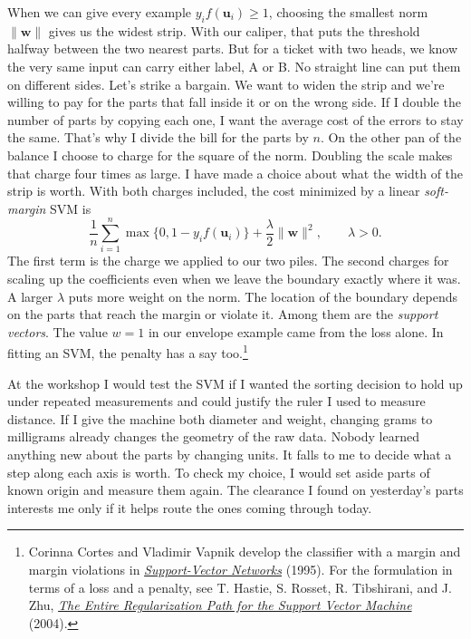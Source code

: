 When we can give every example $y_i f(\boldsymbol u_i)\geq1$, choosing the smallest norm $\lVert\boldsymbol w\rVert$ gives us the widest strip. With our caliper, that puts the threshold halfway between the two nearest parts. But for a ticket with two heads, we know the very same input can carry either label, A or B. No straight line can put them on different sides. Let's strike a bargain. We want to widen the strip and we're willing to pay for the parts that fall inside it or on the wrong side. If I double the number of parts by copying each one, I want the average cost of the errors to stay the same. That's why I divide the bill for the parts by $n$. On the other pan of the balance I choose to charge for the square of the norm. Doubling the scale makes that charge four times as large. I have made a choice about what the width of the strip is worth. With both charges included, the cost minimized by a linear \emph{soft-margin} SVM is
\[
 \frac1n\sum_{i=1}^n \max\{0,1-y_i f(\boldsymbol u_i)\}
       +\frac{\lambda}{2}\lVert\boldsymbol w\rVert^2,\qquad \lambda>0.
\]
The first term is the charge we applied to our two piles. The second charges for scaling up the coefficients even when we leave the boundary exactly where it was. A larger $\lambda$ puts more weight on the norm. The location of the boundary depends on the parts that reach the margin or violate it. Among them are the \emph{support vectors}. The value $w=1$ in our envelope example came from the loss alone. In fitting an SVM, the penalty has a say too.\footnote{Corinna Cortes and Vladimir Vapnik develop the classifier with a margin and margin violations in \href{https://doi.org/10.1007/BF00994018}{\emph{Support-Vector Networks}} (1995). For the formulation in terms of a loss and a penalty, see T. Hastie, S. Rosset, R. Tibshirani, and J. Zhu, \href{https://jmlr.org/papers/v5/hastie04a.html}{\emph{The Entire Regularization Path for the Support Vector Machine}} (2004).}

At the workshop I would test the SVM if I wanted the sorting decision to hold up under repeated measurements and could justify the ruler I used to measure distance. If I give the machine both diameter and weight, changing grams to milligrams already changes the geometry of the raw data. Nobody learned anything new about the parts by changing units. It falls to me to decide what a step along each axis is worth. To check my choice, I would set aside parts of known origin and measure them again. The clearance I found on yesterday's parts interests me only if it helps route the ones coming through today.

